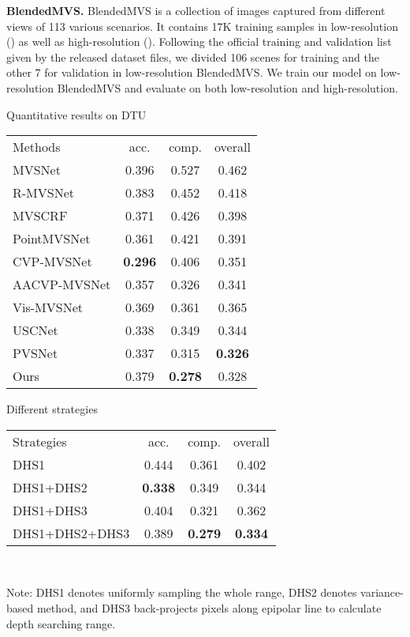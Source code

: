 \documentclass{article}
\begin{document}
{\bf BlendedMVS.}
BlendedMVS \cite{yao2020blendedmvs} is a collection of images captured from different views of 113 various scenarios.
It contains 17K training samples in low-resolution () as well as high-resolution ().
Following the official training and validation list given by the released dataset files, we divided 106 scenes for training and the other 7 for validation in low-resolution BlendedMVS.
We train our model on low-resolution BlendedMVS and evaluate on both low-resolution and high-resolution.

\vspace{1mm}
\begin{minipage}{1\textwidth}
\begin{minipage}[t]{0.48\textwidth}
  \centering
     \makeatletter{}\makeatother\caption{Quantitative results on DTU}
     \scriptsize{
        \begin{tabular}{|l|ccc|} \cline{1-4}
        \centering
            Methods & acc. &comp. &overall\\ \cline{1-4}
            MVSNet\cite{yao2018mvsnet} &0.396 &0.527 &0.462\\ 
    		R-MVSNet\cite{yao2019recurrent} &0.383 &0.452 &0.418\\
    		MVSCRF\cite{xue2019mvscrf} &0.371 &0.426 &0.398\\
    		PointMVSNet\cite{chen2019point} &0.361 &0.421 &0.391\\
    		CVP-MVSNet\cite{yang2020cost} &{\bf0.296} &0.406 &0.351\\
    		AACVP-MVSNet\cite{yu2021attention} &0.357 &0.326 &0.341\\
    		Vis-MVSNet\cite{zhang2020visibility} &0.369 &0.361 &0.365\\
    		USCNet\cite{mao2021uasnet} &0.338 &0.349 &0.344\\
    		PVSNet\cite{xu2020pvsnet} &0.337 &0.315 &{\bf0.326}\\
    		Ours &0.379 &{\bf0.278} &0.328\\ \cline{1-4}
        \end{tabular} \label{tab:dtu}}
\end{minipage}
\begin{minipage}[t]{0.45\textwidth}
\makeatletter{}\makeatother\caption{Different strategies}
        \scriptsize{
         \begin{tabular*}{\linewidth}{|l|ccc|}\cline{1-4} \centering
			Strategies &acc. &comp. &overall\\ \cline{1-4}
			DHS1 &0.444 &0.361 &0.402 \\
			DHS1+DHS2 &{\bf 0.338} &0.349 &0.344 \\
			DHS1+DHS3 &0.404 &0.321 &0.362 \\
			DHS1+DHS2+DHS3 & 0.389 &{\bf 0.279} & {\bf 0.334} \\
			\cline{1-4}  
		\end{tabular*} \label{tab:strategies}
		\\
		\parbox{5.2cm}{Note: DHS1 denotes uniformly sampling the whole range, DHS2 denotes variance-based method, and DHS3 back-projects pixels along epipolar line to calculate depth searching range.
		 }
		}
   \end{minipage}
\end{minipage}
\end{document}
